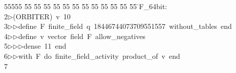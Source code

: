 %
%
\begin{tabbing}
55555 \= 55 \= 55 \= 55 \= 55 \= 55 \= 55 \= 55 \= 55 \= 55 \= 55 \= 55 \= 55 \= \>F\_64bit:\\[0pt]
2\>$\triangleright$\>(ORBITER)\ v\ 10\ \\[0pt]
3\>$\triangleright$\>$\triangleright$\>define\ F\ finite\_field\ q\ 18446744073709551557\ without\_tables\ end\ \\[0pt]
4\>$\triangleright$\>$\triangleright$\>define\ v\ vector\ field\ F\ allow\_negatives\ \\[0pt]
5\>$\triangleright$\>$\triangleright$\>$\triangleright$\>dense\ 11\ end\ \\[0pt]
6\>$\triangleright$\>$\triangleright$\>with\ F\ do\ finite\_field\_activity\ product\_of\ v\ end\\[0pt]
7\>\end{tabbing}
